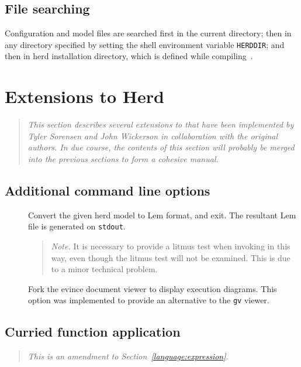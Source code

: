 \subsection{\label{herd:searchpath}File searching}
Configuration and model files are searched first in the current directory;
then in any directory specified
by setting the shell environment variable \texttt{HERDDIR};
and then in herd installation directory, which is defined
while compiling~\herd.

\section{Extensions to Herd}

\begin{quote}\it
This section describes several extensions to \herd{} that have been implemented by Tyler Sorensen and John Wickerson in collaboration with the original authors. In due course, the contents of this section will probably be merged into the previous sections to form a cohesive manual.
\end{quote}

\subsection{Additional command line options}

\begin{description}
\item[{\tt {}}] Convert the given herd model to Lem format, and exit. The resultant Lem file is generated on {\tt stdout}. 
\begin{quote}\emph{Note.} It is necessary to provide a litmus test when invoking \herd{} in this way, even though the litmus test will not be examined. This is due to a minor technical problem.\end{quote}
\item[{\tt {}}] Fork the evince document viewer to display execution diagrams. This option was implemented to provide an alternative to the {\tt gv} viewer.
\end{description}



\subsection{Curried function application}

\begin{quote}\it 
This is an amendment to Section~\ref{language:expression}.
\end{quote}

